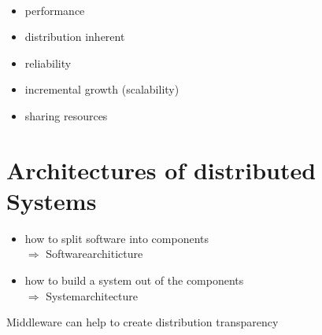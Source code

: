 \documentclass[ngerman,a4paper]{report}
\begin{document}
{\\
\begin{itemize}
\item performance
\item distribution inherent
\item reliability
\item incremental growth (scalability)
\item sharing resources
\end{itemize}

\section{Architectures of distributed Systems}

\begin{itemize}
\item how to split software into components\\
$\Rightarrow$ Softwarearchiticture
\item how to build a system out of the components\\
$\Rightarrow$ Systemarchitecture
\end{itemize}

Middleware can  help to create distribution transparency\\

}
\end{document}
